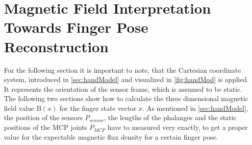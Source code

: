 \section{Magnetic Field Interpretation Towards Finger Pose Reconstruction} \label{sec:magmodel}

For the following section it is important to note, that the Cartesian coordinate system, introduced in \ref{sec:handModel} and visualized in \ref{fig:handMod} is applied. It represents the orientation of the sensor frame, which is assumed to be static. The following two sections show how to calculate the three dimensional magnetic field value $ \mathrm{B}(x) $ for the finger state vector $ x $. As mentioned in \ref{sec:handModel}, the position of the sensors $ P_{sensor} $, the lengths of the phalanges and the static positions of the \ac{MCP} joints $ P_{MCP} $ have to measured very exactly, to get a proper value for the expectable magnetic flux density for a certain finger pose. 

